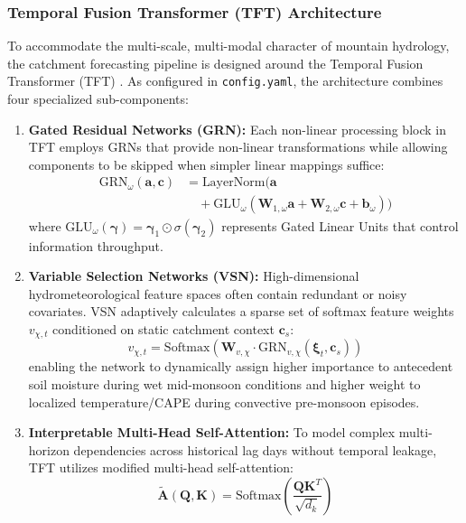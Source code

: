 \documentclass[journal]{IEEEtran}
\begin{document}
\subsubsection{Temporal Fusion Transformer (TFT) Architecture}
To accommodate the multi-scale, multi-modal character of mountain hydrology, the catchment forecasting pipeline is designed around the Temporal Fusion Transformer (TFT) \cite{lim2021temporal}. As configured in \texttt{config.yaml}, the architecture combines four specialized sub-components:
\begin{enumerate}
    \item \textbf{Gated Residual Networks (GRN):} Each non-linear processing block in TFT employs GRNs that provide non-linear transformations while allowing components to be skipped when simpler linear mappings suffice:
    \begin{align}
    \text{GRN}_\omega(\mathbf{a}, \mathbf{c}) &= \text{LayerNorm}\Big(\mathbf{a} \nonumber \\
    &\quad + \text{GLU}_\omega\left(\mathbf{W}_{1, \omega} \mathbf{a} + \mathbf{W}_{2, \omega} \mathbf{c} + \mathbf{b}_\omega\right)\Big)
    \end{align}
    where $\text{GLU}_\omega(\mathbf{\gamma}) = \mathbf{\gamma}_1 \odot \sigma(\mathbf{\gamma}_2)$ represents Gated Linear Units that control information throughput.
    \item \textbf{Variable Selection Networks (VSN):} High-dimensional hydrometeorological feature spaces often contain redundant or noisy covariates. VSN adaptively calculates a sparse set of softmax feature weights $v_{\chi, t}$ conditioned on static catchment context $\mathbf{c}_s$:
    \begin{equation}
    v_{\chi, t} = \text{Softmax}\left(\mathbf{W}_{v, \chi} \cdot \text{GRN}_{v, \chi}(\mathbf{\xi}_t, \mathbf{c}_s)\right)
    \end{equation}
    enabling the network to dynamically assign higher importance to antecedent soil moisture during wet mid-monsoon conditions and higher weight to localized temperature/CAPE during convective pre-monsoon episodes.
    \item \textbf{Interpretable Multi-Head Self-Attention:} To model complex multi-horizon dependencies across historical lag days without temporal leakage, TFT utilizes modified multi-head self-attention:
    \begin{equation}
    \tilde{\mathbf{A}}(\mathbf{Q}, \mathbf{K}) = \text{Softmax}\left(\frac{\mathbf{Q} \mathbf{K}^T}{\sqrt{d_k}}\right)
    \end{equation}

\end{enumerate}
\end{document}
